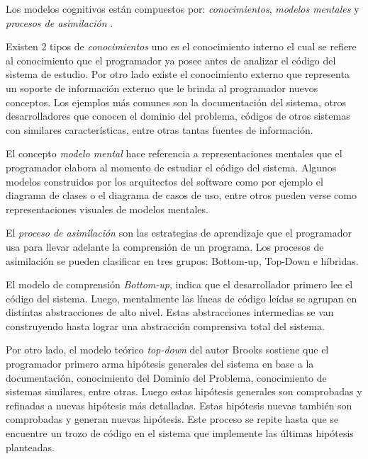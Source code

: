 \documentclass[a4paper,12pt]{report}
\begin{document}
Los modelos cognitivos están compuestos por: \textit{conocimientos}, \textit{modelos mentales} y \textit{procesos de asimilación} \cite{MAS05}.

Existen 2 tipos de \textit{conocimientos} uno es el conocimiento interno el cual se refiere al conocimiento que el programador ya posee antes de analizar el código del sistema de estudio. Por otro lado existe el conocimiento externo que representa un soporte de información externo que le brinda al programador nuevos conceptos. Los ejemplos más comunes son la documentación del sistema, otros desarrolladores que conocen el dominio del problema, códigos de otros sistemas con similares características, entre otras tantas fuentes de información.

El concepto \textit{modelo mental} hace referencia a representaciones mentales que el programador elabora al momento de estudiar el código del sistema. 
Algunos modelos construidos por los arquitectos del software como por ejemplo el diagrama de clases o el diagrama de casos de uso, entre otros pueden verse como representaciones visuales de modelos mentales. 

El \textit{proceso de asimilación} son las estrategias de aprendizaje que el programador usa para llevar adelante la comprensión de un programa. Los procesos de asimilación se pueden clasificar en tres grupos: Bottom-up, Top-Down e híbridas\cite{MPOB03,MAS05}.

El modelo de comprensión \textit{Bottom-up}, indica que el desarrollador primero lee el código del sistema. Luego, mentalmente las líneas de código leídas se agrupan en distintas abstracciones de alto nivel. Estas abstracciones intermedias se van construyendo hasta lograr una abstracción comprensiva total del sistema.

Por otro lado, el modelo teórico \textit{top-down} del autor Brooks sostiene que el programador primero arma hipótesis generales del sistema en base a la documentación, conocimiento del Dominio del Problema, conocimiento de sistemas similares, entre otras. Luego estas hipótesis generales son comprobadas y refinadas a nuevas hipótesis más detalladas. Estas hipótesis nuevas también son comprobadas y generan nuevas hipótesis. Este proceso se repite hasta que se encuentre un trozo de código en el sistema que implemente las últimas hipótesis planteadas.

\end{document}
